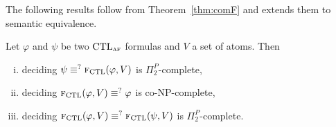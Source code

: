 \documentclass{article}
\begin{document}
%
%
%
%

The following results follow from Theorem~\ref{thm:comF} and extends them to semantic equivalence.
\begin{corollary}
Let $\varphi$ and $\psi$ be two $\textrm{CTL}_{\textsc{a} \textsc{f}}$ formulas and $V$ a set of atoms. Then
\begin{enumerate}[(i)]
  \item deciding $\psi \equiv^? {\textsc{f}_{\textrm{CTL}}}(\varphi, V)$ is $\Pi_2^P$-complete,
  \item deciding ${\textsc{f}_{\textrm{CTL}}}(\varphi, V) \equiv^? \varphi$ is co-NP-complete,
  \item deciding ${\textsc{f}_{\textrm{CTL}}}(\varphi, V) \equiv^? {\textsc{f}_{\textrm{CTL}}}(\psi, V)$ is $\Pi_2^P$-complete.
\end{enumerate}
\end{corollary}
\end{document}
